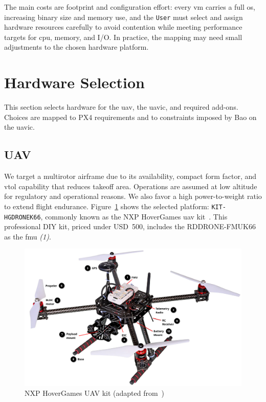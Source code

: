 The main costs are footprint and configuration effort: every \gls{vm} carries a
full \gls{os}, increasing binary size and memory use, and the \lstinline|User|
must select and assign hardware resources carefully to avoid contention while
meeting performance targets for \gls{cpu}, memory, and I/O. In practice, the
mapping may need small adjustments to the chosen hardware platform.

\section{Hardware Selection}
\label{sec:hardware-selection}
This section selects hardware for the \gls{uav}, the \gls{uavic}, and required
add-ons. Choices are mapped to PX4 requirements and to constraints imposed by
Bao on the \gls{uavic}.

\subsection{UAV}
\label{sec:uav-hw-sel}
We target a multirotor airframe due to its availability, compact form factor,
and \gls{vtol} capability that reduces takeoff area. Operations are assumed at
low altitude for regulatory and operational reasons. We also favor a high
power-to-weight ratio to extend flight endurance.
%
Figure~\ref{fig:hoverGames-drone} shows the selected platform:
\lstinline{KIT-HGDRONEK66}, commonly known as the NXP HoverGames \gls{uav}
kit~\cite{nxp-hoverGames-uav}. This professional DIY kit, priced under
USD~500, includes the RDDRONE-FMUK66 as the \gls{fmu} \emph{(1)}.

\begin{figure}[!hbt]
  \centering
  \includegraphics[width=1.0\textwidth]{./img/pdf/hoverGames-drone.pdf}
  \caption[NXP HoverGames UAV kit]{NXP HoverGames UAV kit (adapted from~\cite{nxp-hoverGames-uav})\footnotemark}
  \label{fig:hoverGames-drone}
\end{figure}

